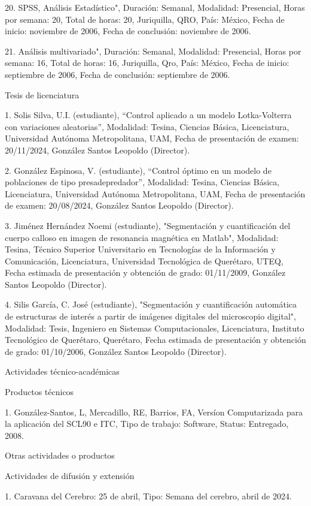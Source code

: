 \documentclass[12pt]{article}
\begin{document}
20. SPSS, Análisis Estadístico", Duración: Semanal, Modalidad: Presencial, Horas por semana: 20, Total de horas: 20, Juriquilla, QRO, 
País: México, Fecha de inicio: noviembre de 2006, Fecha de conclusión: noviembre de 2006.

21. Análisis multivariado", Duración: Semanal, Modalidad: Presencial, Horas por semana: 16, Total de horas: 16, Juriquilla, Qro, País: 
México, Fecha de inicio: septiembre de 2006, Fecha de conclusión: septiembre de 2006.

Tesis de licenciatura

1. Solis Silva, U.I. (estudiante), “Control aplicado a un modelo Lotka-Volterra con variaciones aleatorias”, Modalidad: Tesina, 
Ciencias Básica, Licenciatura, Universidad Autónoma Metropolitana, UAM, Fecha de presentación de examen: 20/11/2024, González Santos 
Leopoldo (Director).

2. González Espinosa, V. (estudiante), “Control óptimo en un modelo de poblaciones de tipo presadepredador”, Modalidad: Tesina, 
Ciencias Básica, Licenciatura, Universidad Autónoma Metropolitana, UAM, Fecha de presentación de examen: 20/08/2024, González Santos 
Leopoldo (Director).

3. Jiménez Hernández Noemi (estudiante), "Segmentación y cuantificación del cuerpo calloso en imagen de resonancia magnética en 
Matlab", Modalidad: Tesina, Técnico Superior Universitario en Tecnologías de la Información y Comunicación, Licenciatura, Universidad 
Tecnológica de Querétaro, UTEQ, Fecha estimada de presentación y obtención de grado: 01/11/2009, González Santos Leopoldo (Director).

4. Silis García, C. José (estudiante), "Segmentación y cuantificación automática de estructuras de interés a partir de imágenes 
digitales del microscopio digital", Modalidad: Tesis, Ingeniero en Sistemas Computacionales, Licenciatura, Instituto Tecnológico de 
Querétaro, Querétaro, Fecha estimada de presentación y obtención de grado: 01/10/2006, González Santos Leopoldo (Director).

Actividades técnico-académicas

Productos técnicos

1. González-Santos, L, Mercadillo, RE, Barrios, FA, Versíon Computarizada para la aplicación del SCL90 e ITC, Tipo de trabajo: 
Software, Status: Entregado, 2008.

Otras actividades o productos

Actividades de difusión y extensión

1. Caravana del Cerebro: 25 de abril, Tipo: Semana del cerebro, abril de 2024.
\end{document}
